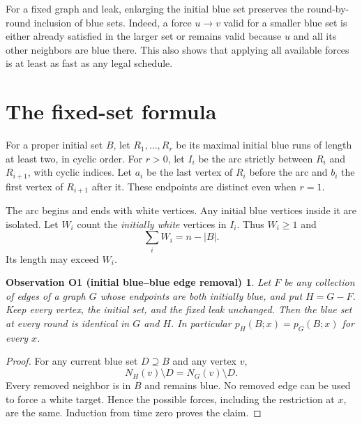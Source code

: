 \documentclass[11pt,a4paper]{article}
\newtheorem*{lemmaO1}{Observation O1 (initial blue--blue edge removal)}
\begin{document}
For a fixed graph and leak, enlarging the initial blue set preserves the
round-by-round inclusion of blue sets. Indeed, a force $u\to v$ valid for
a smaller blue set is either already satisfied in the larger set or remains
valid because $u$ and all its other neighbors are blue there. This also shows
that applying all available forces is at least as fast as any legal schedule.

\section{The fixed-set formula}

For a proper initial set $B$, let $R_1,\ldots,R_r$ be its maximal initial
blue runs of length at least two, in cyclic order. For $r>0$, let $I_i$ be
the arc strictly between $R_i$ and $R_{i+1}$, with cyclic indices. Let $a_i$
be the last vertex of $R_i$ before the arc and $b_i$ the first vertex of
$R_{i+1}$ after it. These endpoints are distinct even when $r=1$.

The arc begins and ends with white vertices. Any initial blue vertices
inside it are isolated. Let $W_i$ count the \emph{initially white} vertices
in $I_i$. Thus $W_i\geq1$ and
\begin{equation}
 \sum_i W_i=n-|B|. \label{eq:whitecount}
\end{equation}
Its length may exceed $W_i$.

\begin{lemmaO1}
Let $F$ be any collection of edges of a graph $G$ whose endpoints are both
initially blue, and put $H=G-F$. Keep every vertex, the initial set, and the
fixed leak unchanged. Then the blue set at every round is identical in $G$
and $H$. In particular $p_H(B;x)=p_G(B;x)$ for every $x$.
\end{lemmaO1}
\begin{proof}
For any current blue set $D\supseteq B$ and any vertex $v$,
\[
 N_H(v)\setminus D=N_G(v)\setminus D.
\]
Every removed neighbor is in $B$ and remains blue. No removed edge can be
used to force a white target. Hence the possible forces, including the
restriction at $x$, are the same. Induction from time zero proves the claim.
\end{proof}
\end{document}
